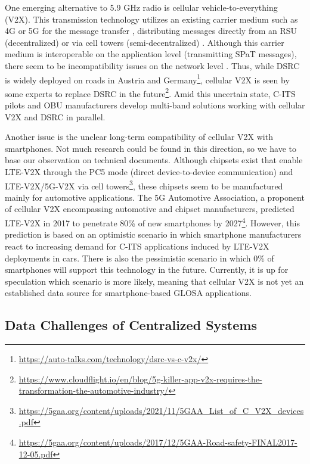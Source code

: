 One emerging alternative to 5.9 GHz radio is cellular vehicle-to-everything (V2X). This transmission technology utilizes an existing carrier medium such as 4G or 5G for the message transfer \cite{xia_field_2012, zweck_traffic_2013, bhattacharyya_assessing_2022}, distributing messages directly from an RSU (decentralized) \cite{bohm_radio_2017} or via cell towers (semi-decentralized) \cite{strobl_c-its_2019, jacob_ivs-kom_2020}. Although this carrier medium is interoperable on the application level (transmitting SPaT messages), there seem to be incompatibility issues on the network level \cite{bohm_radio_2017}. Thus, while DSRC is widely deployed on roads in Austria and Germany\footnote{\url{https://auto-talks.com/technology/dsrc-vs-c-v2x/}}, cellular V2X is seen by some experts to replace DSRC in the future\footnote{\url{https://www.cloudflight.io/en/blog/5g-killer-app-v2x-requires-the-transformation-the-automotive-industry/}}. Amid this uncertain state, C-ITS pilots \cite{strobl_c-its_2019} and OBU manufacturers \cite{jacob_ivs-kom_2020} develop multi-band solutions working with cellular V2X and DSRC in parallel.

Another issue is the unclear long-term compatibility of cellular V2X with smartphones. Not much research could be found in this direction, so we have to base our observation on technical documents. Although chipsets exist that enable LTE-V2X through the PC5 mode (direct device-to-device communication) and LTE-V2X/5G-V2X via cell towers\footnote{\url{https://5gaa.org/content/uploads/2021/11/5GAA_List_of_C_V2X_devices.pdf}}, these chipsets seem to be manufactured mainly for automotive applications. The 5G Automotive Association, a proponent of cellular V2X encompassing automotive and chipset manufacturers, predicted LTE-V2X in 2017 to penetrate 80\% of new smartphones by 2027\footnote{\url{https://5gaa.org/content/uploads/2017/12/5GAA-Road-safety-FINAL2017-12-05.pdf}}. However, this prediction is based on an optimistic scenario in which smartphone manufacturers react to increasing demand for C-ITS applications induced by LTE-V2X deployments in cars. There is also the pessimistic scenario in which 0\% of smartphones will support this technology in the future. Currently, it is up for speculation which scenario is more likely, meaning that cellular V2X is not yet an established data source for smartphone-based GLOSA applications.

\subsection{Data Challenges of Centralized Systems}

